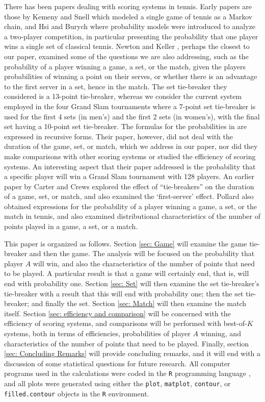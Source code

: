 \documentclass[11pt]{article}
\theoremstyle{plain}
\theoremstyle{definition}
\begin{document}
There has been papers dealing with scoring systems in tennis. Early papers are those by Kemeny and Snell \cite{Kemeny_Snell_1960} which modeled a single game of tennis as a Markov chain, and Hsi and Burych \cite{Hsi_Burych_1971} where probability models were introduced to analyze a two-player competition, in particular presenting the probability that one player wins a single set of classical tennis. Newton and Keller \cite{Newton_Keller_2005}, perhaps the closest to our paper, examined some of the questions we are also addressing, such as the probability of a player winning a game, a set, or the match, given the players probabilities of winning a point on their serves, or whether there is an advantage to the first server in a set, hence in the match. The set tie-breaker they considered is a 13-point tie-breaker, whereas we consider the current system employed in the four Grand Slam tournaments where a 7-point set tie-breaker is used for the first 4 sets (in men's) and the first 2 sets (in women's), with the final set having a 10-point set tie-breaker. The formulas for the probabilities in \cite{Newton_Keller_2005} are expressed in recursive forms. Their paper, however, did not deal with the duration of the game, set, or match, which we address in our paper, nor did they make comparisons with other scoring systems or studied the efficiency of scoring systems. An interesting aspect that their paper addressed is the probability that a specific player will win a Grand Slam tournament with 128 players. An earlier paper by Carter and Crews \cite{Carter_Crews_1974} explored the effect of ``tie-breakers'' on the duration of a game, set, or match, and also examined the `first-server' effect. Pollard \cite{Pollard1983} also obtained expressions for the probability of a player winning a game, a set, or the match in tennis, and also examined distributional characteristics of the number of points played in a game, a set, or a match. 

This paper is organized as follows. Section \ref{sec: Game} will examine the game tie-breaker and then the game. The analysis will be focused on the probability that player $A$ will win, and also the characteristics of the number of points that need to be played. A particular result is that a game will certainly end, that is, will end with probability one. Section \ref{sec: Set} will then examine the set tie-breaker's tie-breaker with a result that this will end with probability one; then the set tie-breaker; and finally the set. Section \ref{sec: Match} will then examine the match itself. Section \ref{sec: efficiency and comparison} will be concerned with the efficiency of scoring systems, and comparisons will be performed with best-of-$K$ systems, both in terms of efficiencies, probabilities of player $A$ winning, and characteristics of the number of points that need to be played. Finally, section \ref{sec: Concluding Remarks} will provide concluding remarks, and it will end with a discussion of some statistical questions for future research. All computer programs used in the calculations were coded in the {\tt R} programming language \cite{R}, and all plots were generated using either the {\tt plot}, {\tt matplot}, {\tt contour}, or {\tt filled.contour} objects in the {\tt R} environment.
\end{document}

